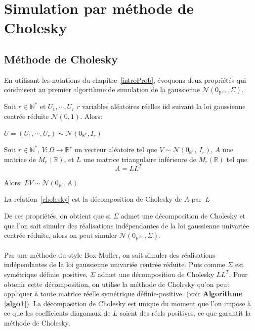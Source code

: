 \chapter{Simulation par méthode de Cholesky}
\label{chapCholesky}
\section{Méthode de Cholesky}

\label{choleskySection1} En utilisant les notations du chapitre~\ref{introProb}, évoquons deux propriétés qui conduisent au premier algorithme de simulation
de la gaussienne $\mathcal{N}(0_{\mathbb{R}^{dm}},\Sigma)$.


\begin{property}
  Soit $r \in \mathbb{N}^{*}$ et $U_1, \cdots, U_r$ $r$ variables aléatoires réelles iid
suivant la loi gaussienne centrée réduite $\mathcal{N}(0,1)$. Alors:
\begin{center}
$U = (U_1, \cdots, U_r) \sim \mathcal{N}(0_{\mathbb{R}^r}, I_r)$
\end{center}
\end{property}

\begin{property}
Soit  $r \in \mathbb{N}^{*}$, $V: \Omega \rightarrow \mathbb{R}^r $ un vecteur aléatoire tel que $V \sim \mathcal{N}(0_{\mathbb{R}^r},~I_r)$, $A$ une matrice de $M_{r}(\mathbb{R})$, et $L$ une matrice triangulaire inférieure de $M_{r}(\mathbb{R})$ tel que 
\begin{equation}
A = LL^{T} \label{cholesky}
\end{equation}
 
\begin{center} Alors: $LV \sim \mathcal{N}(0_{\mathbb{R}^r},A)$ \end{center}
\end{property}

\begin{remark}
  La relation~\eqref{cholesky}  est la décomposition de Cholesky de $A$ par~$L$
\end{remark}


\noindent De ces propriétés, on obtient que si $\Sigma$ admet une décomposition de Cholesky et que l'on sait simuler des réalisations indépendantes
de la loi gaussienne univariée centrée réduite, alors on peut simuler $\mathcal{N}(0_{\mathbb{R}^{dm}},\Sigma)$.\\
~\\
Par une méthode du style Box-Muller, on sait simuler des réalisations indépendantes de la loi gaussienne univariée centrée réduite.
Puis comme $\Sigma$ est symétrique définie~positive, $\Sigma$ admet une décomposition de Cholesky $LL^{T}$.
Pour obtenir cette décomposition, on utilise la méthode de Cholesky qu'on peut appliquer à toute matrice réelle symétrique définie-positive.
(voir \textbf{Algorithme \ref{algo1}}). La décomposition de Cholesky est unique du moment que l'on impose à ce que les
coefficients diagonaux de $L$ soient des réels positives, ce que garantit la méthode de Cholesky. 

